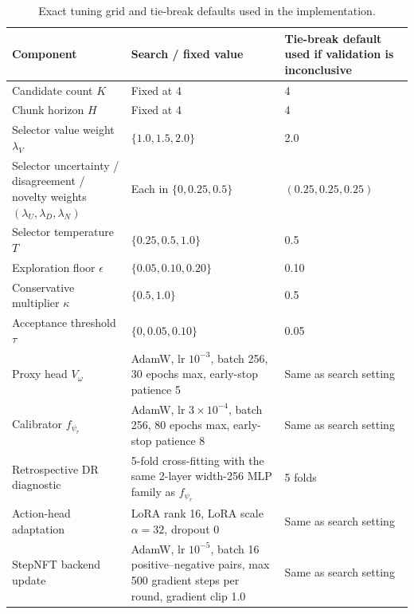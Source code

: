 \documentclass[10pt]{article}
\theoremstyle{plain}
\theoremstyle{definition}
\theoremstyle{remark}
\begin{document}
\begin{table}[H]
\centering
\small
\caption{Exact tuning grid and tie-break defaults used in the implementation.\label{tab:hparams}}
\begin{tabularx}{\linewidth}{@{}p{3.7cm}p{5.1cm}X@{}}
\toprule
Component & Search / fixed value & Tie-break default used if validation is inconclusive \\
\midrule
Candidate count $K$ & Fixed at 4 & 4 \\
Chunk horizon $H$ & Fixed at 4 & 4 \\
Selector value weight $\lambda_V$ & $\{1.0,1.5,2.0\}$ & 2.0 \\
Selector uncertainty / disagreement / novelty weights $(\lambda_U,\lambda_D,\lambda_N)$ & Each in $\{0,0.25,0.5\}$ & $(0.25,0.25,0.25)$ \\
Selector temperature $T$ & $\{0.25,0.5,1.0\}$ & 0.5 \\
Exploration floor $\epsilon$ & $\{0.05,0.10,0.20\}$ & 0.10 \\
Conservative multiplier $\kappa$ & $\{0.5,1.0\}$ & 0.5 \\
Acceptance threshold $\tau$ & $\{0,0.05,0.10\}$ & 0.05 \\
Proxy head $V_\omega$ & AdamW, lr $10^{-3}$, batch 256, 30 epochs max, early-stop patience 5 & Same as search setting \\
Calibrator $f_{\psi_r}$ & AdamW, lr $3\times10^{-4}$, batch 256, 80 epochs max, early-stop patience 8 & Same as search setting \\
Retrospective DR diagnostic & 5-fold cross-fitting with the same 2-layer width-256 MLP family as $f_{\psi_r}$ & 5 folds \\
Action-head adaptation & LoRA rank 16, LoRA scale $\alpha=32$, dropout 0 & Same as search setting \\
StepNFT backend update & AdamW, lr $10^{-5}$, batch 16 positive--negative pairs, max 500 gradient steps per round, gradient clip 1.0 & Same as search setting \\
\bottomrule
\end{tabularx}
\end{table}
\end{document}
